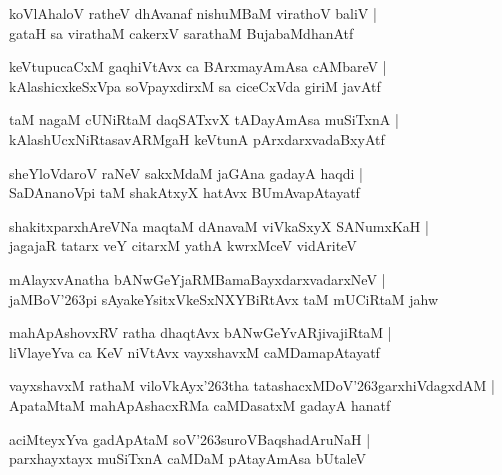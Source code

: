 \documentclass[twoside,12pt,openright]{book}
\def\S{\char'263}
\newcounter{shloka}[chapter]
\begin{document}
\begin{shloka}%
koVlAhaloV ratheV dhAvanaf nishuMBaM virathoV baliV |\\
gataH sa virathaM cakerxV sarathaM BujabaMdhanAtf
\end{shloka}

\begin{shloka}%
keVtupucaCxM gaqhiVtAvx ca BArxmayAmAsa cAMbareV |\\
kAlashicxkeSxVpa soVpayxdirxM sa ciceCxVda giriM javAtf
\end{shloka}

\begin{shloka}%
taM nagaM cUNiRtaM daqSATxvX tADayAmAsa muSiTxnA |\\
kAlashUcxNiRtasavARMgaH keVtunA pArxdarxvadaBxyAtf
\end{shloka}

\begin{shloka}%
sheYloVdaroV raNeV sakxMdaM jaGAna gadayA haqdi |\\
SaDAnanoVpi taM shakAtxyX hatAvx BUmAvapAtayatf
\end{shloka}

\begin{shloka}%
shakitxparxhAreVNa maqtaM dAnavaM viVkaSxyX SANumxKaH |\\
jagajaR tatarx veY citarxM yathA kwrxMceV vidAriteV
\end{shloka}

\begin{shloka}%
mAlayxvAnatha bANwGeYjaRMBamaBayxdarxvadarxNeV |\\
jaMBoV\S pi sAyakeYsitxVkeSxNXYBiRtAvx taM mUCiRtaM jahw
\end{shloka}

\begin{shloka}%
mahApAshovxRV ratha dhaqtAvx bANwGeYvARjivajiRtaM |\\
liVlayeYva ca KeV niVtAvx vayxshavxM caMDamapAtayatf
\end{shloka}

\begin{shloka}%
vayxshavxM rathaM viloVkAyx\S tha tatashacxMDoV\S garxhiVdagxdAM |\\
ApataMtaM mahApAshacxRMa caMDasatxM gadayA hanatf
\end{shloka}

\begin{shloka}%
aciMteyxYva gadApAtaM soV\S suroVBaqshadAruNaH |\\
parxhayxtayx muSiTxnA caMDaM pAtayAmAsa bUtaleV 
\end{shloka}
\end{document}
